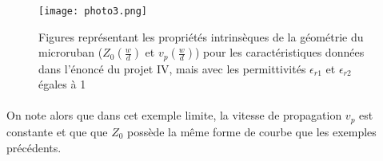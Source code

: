 \begin{figure}[htb]
\begin{center}
\texttt{[image: photo3.png]}
\label{mangemoilcul}
\caption{Figures représentant les propriétés intrinsèques de la géométrie du microruban ($Z_0 (\frac{w}{d})$ et $v_p(\frac{w}{d})$) pour les caractéristiques données dans l'énoncé du projet IV, mais avec les permittivités $\epsilon_{r1}$ et $\epsilon_{r2}$ égales à 1}
\end{center}
\end{figure}

\paragraph{}On note alors que dans cet exemple limite, la vitesse de propagation $v_p$ est constante et que que $Z_0$ possède la même forme de courbe que les exemples précédents. 



